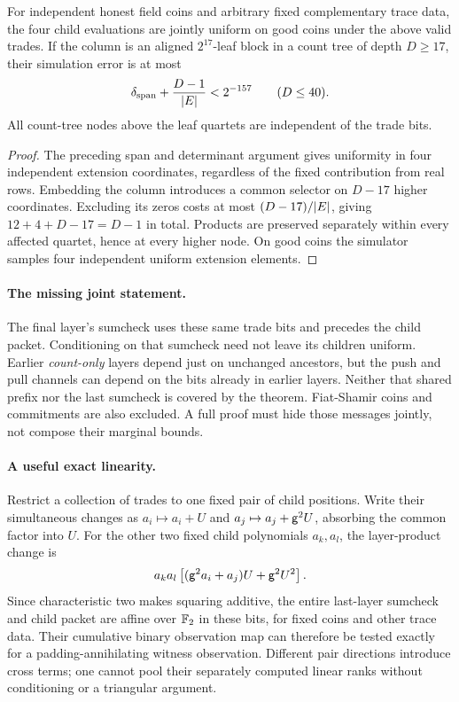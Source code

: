 \begin{theorem}
For independent honest field coins and arbitrary fixed complementary trace data, the four child evaluations are jointly uniform on good coins under the above valid trades. If the column is an aligned $2^{17}$-leaf block in a count tree of depth $D\ge17$, their simulation error is at most
\[
 \delta_{\mathrm{span}}+\frac{D-1}{|E|}<2^{-157}
 \qquad(D\le40).
\]
All count-tree nodes above the leaf quartets are independent of the trade bits.
\end{theorem}
\begin{proof}
The preceding span and determinant argument gives uniformity in four independent extension coordinates, regardless of the fixed contribution from real rows. Embedding the column introduces a common selector on $D-17$ higher coordinates. Excluding its zeros costs at most $(D-17)/|E|$, giving $12+4+D-17=D-1$ in total. Products are preserved separately within every affected quartet, hence at every higher node. On good coins the simulator samples four independent uniform extension elements.
\end{proof}

\paragraph{The missing joint statement.} The final layer's sumcheck uses these same trade bits and precedes the child packet. Conditioning on that sumcheck need not leave its children uniform. Earlier \emph{count-only} layers depend just on unchanged ancestors, but the push and pull channels can depend on the bits already in earlier layers. Neither that shared prefix nor the last sumcheck is covered by the theorem. Fiat-Shamir coins and commitments are also excluded. A full proof must hide those messages jointly, not compose their marginal bounds.

\paragraph{A useful exact linearity.} Restrict a collection of trades to one fixed pair of child positions. Write their simultaneous changes as $a_i\mapsto a_i+U$ and $a_j\mapsto a_j+\mathsf{g}^2 U$, absorbing the common factor into $U$. For the other two fixed child polynomials $a_k,a_l$, the layer-product change is
\[
 a_k a_l\left[(\mathsf{g}^2 a_i+a_j)U+\mathsf{g}^2 U^2\right].
\]
Since characteristic two makes squaring additive, the entire last-layer sumcheck and child packet are affine over $\mathbb{F}_2$ in these bits, for fixed coins and other trace data. Their cumulative binary observation map can therefore be tested exactly for a padding-annihilating witness observation. Different pair directions introduce cross terms; one cannot pool their separately computed linear ranks without conditioning or a triangular argument.

